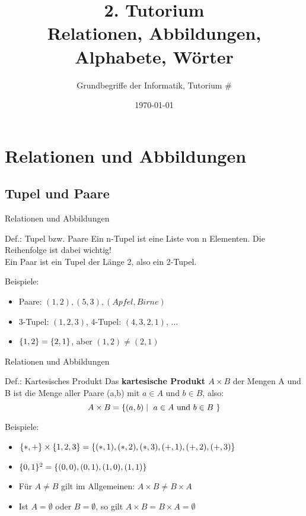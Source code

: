 



\title[Relationen, Abbildungen, Alphabete, Wörter]{2. Tutorium\\ Relationen, Abbildungen, Alphabete, Wörter}
\subtitle{Grundbegriffe der Informatik, Tutorium \#\mytutnumber}
\date{\today}


\titleframe
\roadmap

\section{Relationen und Abbildungen}
\subsection{Tupel und Paare}

	\begin{frame}{Relationen und Abbildungen}
		\begin{block}{Def.: Tupel bzw. Paare}
			Ein n-Tupel ist eine Liste von n Elementen. Die Reihenfolge ist dabei wichtig!\\
			Ein Paar ist ein Tupel der Länge 2, also ein 2-Tupel.			
		\end{block}
		\begin{exampleblock}{Beispiele:}
			\begin{itemize}
				\item Paare: $(1,2),(5,3),(Apfel, Birne)$
				\item 3-Tupel: $(1,2,3)$, 4-Tupel: $(4,3,2,1)$, ...
				\item $\{ 1,2 \}=\{ 2,1 \}$, aber $(1,2)\neq(2,1)$
			\end{itemize}			
		\end{exampleblock}	
	\end{frame}

	\begin{frame}{Relationen und Abbildungen}
		\begin{block}{Def.: Kartesisches Produkt}
			Das \textbf{kartesische Produkt $A \times B$} der Mengen A und B ist die Menge aller Paare (a,b) mit $a \in A$ und $b \in B$, also:
			$$A \times B = \{ (a,b) \mid \text{ $a \in A$ und $b \in B$ } \}$$
		\end{block}
	
		\begin{exampleblock}{Beispiele:}
			\begin{itemize}
				\item $\{ *, + \} \times \{ 1, 2, 3 \} = \{ (*,1), (*,2), (*,3), (+,1), (+,2), (+,3) \}$
				\item $\{ 0,1 \}^2 = \{ (0,0),(0,1),(1,0),(1,1) \}$ 
				\item Für $A \neq B$ gilt im Allgemeinen: $A \times B \neq B \times A$
				\item Ist $A = \emptyset$ oder $B = \emptyset$, so gilt $A \times B = B \times A = \emptyset$
			\end{itemize}			
		\end{exampleblock}
	\end{frame}

